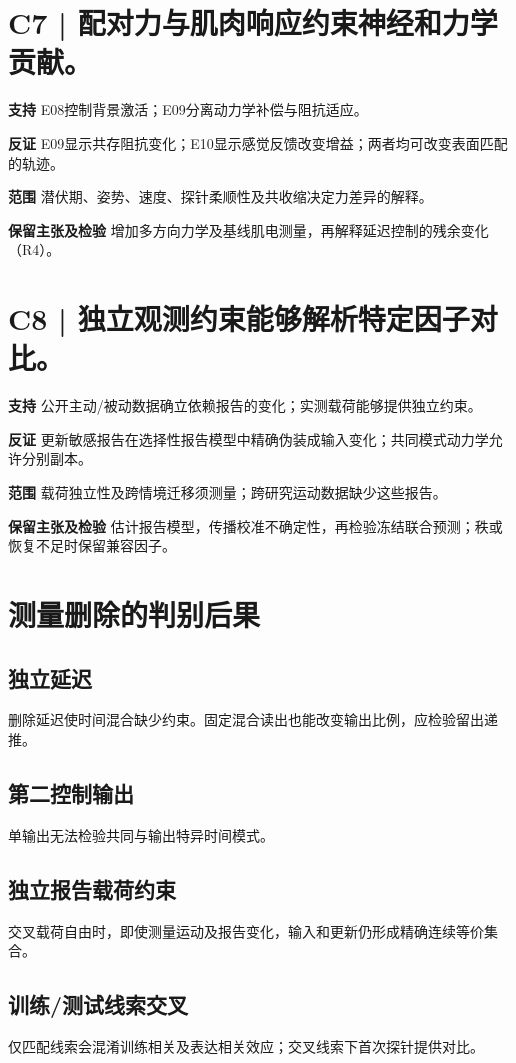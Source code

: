 \documentclass[11pt,a4paper]{article}
\begin{document}
\clearpage\section{C7 | 配对力与肌肉响应约束神经和力学贡献。}
\textbf{支持} E08控制背景激活；E09分离动力学补偿与阻抗适应。\par
\textbf{反证} E09显示共存阻抗变化；E10显示感觉反馈改变增益；两者均可改变表面匹配的轨迹。\par
\textbf{范围} 潜伏期、姿势、速度、探针柔顺性及共收缩决定力差异的解释。\par
\textbf{保留主张及检验} 增加多方向力学及基线肌电测量，再解释延迟控制的残余变化（R4）。\par
\medskip\section{C8 | 独立观测约束能够解析特定因子对比。}
\textbf{支持} 公开主动/被动数据确立依赖报告的变化；实测载荷能够提供独立约束。\par
\textbf{反证} 更新敏感报告在选择性报告模型中精确伪装成输入变化；共同模式动力学允许分别副本。\par
\textbf{范围} 载荷独立性及跨情境迁移须测量；跨研究运动数据缺少这些报告。\par
\textbf{保留主张及检验} 估计报告模型，传播校准不确定性，再检验冻结联合预测；秩或恢复不足时保留兼容因子。\par
\clearpage\section{测量删除的判别后果}
\subsection*{独立延迟}
删除延迟使时间混合缺少约束。固定混合读出也能改变输出比例，应检验留出递推。

\subsection*{第二控制输出}
单输出无法检验共同与输出特异时间模式。

\subsection*{独立报告载荷约束}
交叉载荷自由时，即使测量运动及报告变化，输入和更新仍形成精确连续等价集合。

\subsection*{训练/测试线索交叉}
仅匹配线索会混淆训练相关及表达相关效应；交叉线索下首次探针提供对比。
\end{document}
